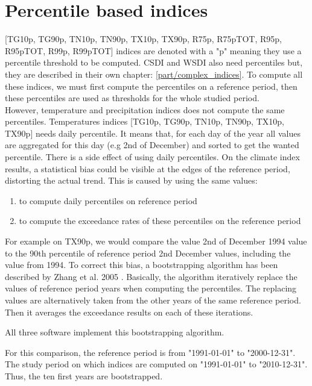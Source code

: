 \documentclass[a4paper,11pt]{article}
\begin{document}
    \section{Percentile based indices}
        [TG10p, TG90p, TN10p, TN90p, TX10p, TX90p, R75p, R75pTOT, R95p, R95pTOT, R99p, R99pTOT] indices are denoted with a "p" meaning they use a percentile threshold to be computed. 
        CSDI and WSDI also need percentiles but, they are described in their own chapter: \ref{part/complex_indices}.
        To compute all these indices, we must first compute the percentiles on a reference period, then these percentiles are used as thresholds for the whole studied period.\\

        However, temperature and precipitation indices does not compute the same percentiles.
        Temperatures indices [TG10p, TG90p, TN10p, TN90p, TX10p, TX90p] needs daily percentile. It means that, for each day of the year all values are aggregated for this day (e.g 2nd of December) and sorted to get the wanted percentile. 
        There is a side effect of using daily percentiles. On the climate index results, a statistical bias could be visible at the edges of the reference period, distorting the actual trend.
        This is caused by using the same values:
        \begin{enumerate}
            \item to compute daily percentiles on reference period
            \item to compute the exceedance rates of these percentiles on the reference period
        \end{enumerate}
        For example on TX90p, we would compare the value 2nd of December 1994 value to the 90th percentile of reference period 2nd December values, including the value from 1994.
        To correct this bias, a bootstrapping algorithm has been described by Zhang et al. 2005 \cite{quote/zhang_et_al}.
        Basically, the algorithm iteratively replace the values of reference period years when computing the percentiles.
        The replacing values are alternatively taken from the other years of the same reference period.
        Then it averages the exceedance results on each of these iterations.

        All three software implement this bootstrapping algorithm.

        For this comparison, the reference period is from "1991-01-01" to "2000-12-31".
        The study period on which indices are computed on "1991-01-01" to "2010-12-31".
        Thus, the ten first years are bootstrapped.
\end{document}
